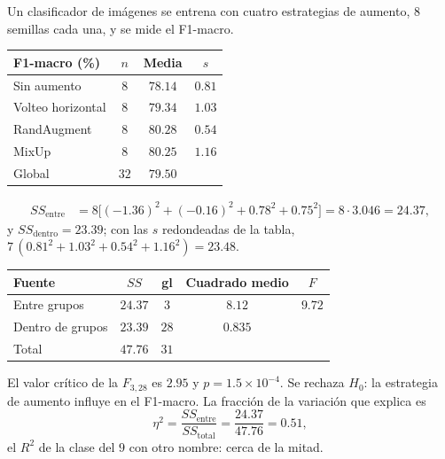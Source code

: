 \documentclass[11pt,letterpaper]{article}
\begin{document}
\begin{ejemplo}
    Un clasificador de imágenes se entrena con cuatro estrategias de
    aumento, $8$ semillas cada una, y se mide el F1-macro.
    \begin{center}
    \small
    \begin{tabular}{lccc}
        \toprule
        \textbf{F1-macro (\%)} & $n$ & \textbf{Media} & $s$ \\
        \midrule
        Sin aumento       & $8$ & $78.14$ & $0.81$ \\
        Volteo horizontal & $8$ & $79.34$ & $1.03$ \\
        RandAugment       & $8$ & $80.28$ & $0.54$ \\
        MixUp             & $8$ & $80.25$ & $1.16$ \\
        \midrule
        Global            & $32$ & $79.50$ & \\
        \bottomrule
    \end{tabular}
    \end{center}
    \begin{align*}
        SS_{\text{entre}}
        &= 8 \big[ (-1.36)^2 + (-0.16)^2 + 0.78^2 + 0.75^2 \big]
         = 8 \cdot 3.046 = 24.37 ,
    \end{align*}
    y $SS_{\text{dentro}} = 23.39$; con las $s$ redondeadas de la tabla,
    $7\,(0.81^2 + 1.03^2 + 0.54^2 + 1.16^2) = 23.48$.
    \begin{center}
    \small
    \begin{tabular}{lcccc}
        \toprule
        \textbf{Fuente} & $SS$ & \textbf{gl} & \textbf{Cuadrado medio}
        & $F$ \\
        \midrule
        Entre grupos & $24.37$ & $3$ & $8.12$ & $9.72$ \\
        Dentro de grupos & $23.39$ & $28$ & $0.835$ & \\
        Total & $47.76$ & $31$ & & \\
        \bottomrule
    \end{tabular}
    \end{center}
    El valor crítico de la $F_{3, 28}$ es $2.95$ y
    $p = 1.5 \times 10^{-4}$. Se rechaza $H_0$: la estrategia de
    aumento influye en el F1-macro. La fracción de la variación que
    explica es
    \[
        \eta^2 = \frac{SS_{\text{entre}}}{SS_{\text{total}}}
               = \frac{24.37}{47.76} = 0.51 ,
    \]
    el $R^2$ de la clase del $9$ con otro nombre: cerca de la mitad.
\end{ejemplo}
\end{document}
